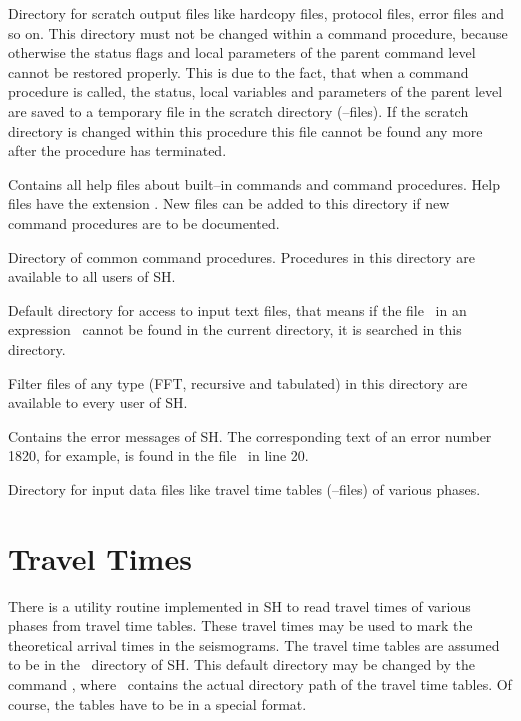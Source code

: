 \begin{deflist}{}
\item[\exm{scratch}]
   Directory for scratch output files like hardcopy files, protocol
   files, error files and so on.  This directory must not be changed
   within a command procedure, because otherwise the status flags
   and local parameters of the parent command level cannot be restored
   properly.  This is due to the fact, that when a command procedure
   is called, the status, local variables and parameters of the parent
   level are saved to a temporary file in the scratch directory
   (--files).  If the scratch directory is changed within
   this procedure this file cannot be found any more after the
   procedure has terminated.
\item[\exm{help}]
   Contains all help files about built--in commands and command
   procedures.  Help files have the extension .  New files
   can be added to this directory if new command procedures are to
   be documented.
\item[\exm{command}]
   Directory of common command procedures.  Procedures in this
   directory are available to all users of SH.
\item[\exm{globals}]
   Default directory for access to input text files, that means
   if the file \ in an expression \
   cannot be found in the current directory, it is searched in this
   directory.
\item[\exm{filter}]
   Filter files of any type (FFT, recursive and tabulated) in this
   directory are available to every user of SH.
\item[\exm{errors}]
   Contains the error messages of SH.  The corresponding text of an
   error number 1820, for example, is found in the file
   \ in line 20.
\item[\exm{inputs}]
   Directory for input data files like travel time tables
   (--files) of various phases.
\end{deflist}



\section{Travel Times}

There is a utility routine implemented in SH to read travel times
of various phases from travel time tables.  These travel times may
be used to mark the theoretical arrival times in the seismograms.
The travel time tables are assumed to be in the \exm{input}\
directory of SH.  This default directory may be changed by the
command \cmd{fct tt\_table <path>}, where \cmd{<path>}\ contains
the actual directory path of the travel time tables.  Of course,
the tables have to be in a special format.

